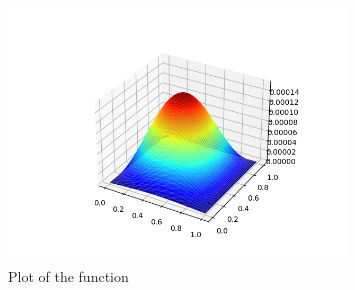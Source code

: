\documentclass{article}
\begin{document}
\begin{figure}[H]
    \begin{center}
        \includegraphics[width=0.8\textwidth]{Images/3d_heat.png}
        \caption{Plot of the function}
    \end{center}
\end{figure}
\end{document}

